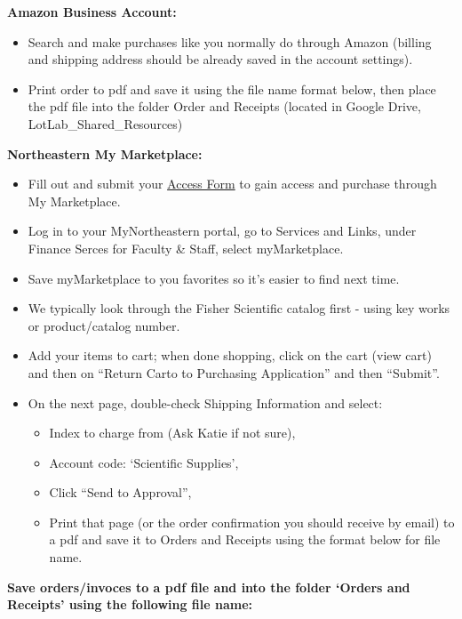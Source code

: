 \documentclass[
  letterpaper,
  DIV=11,
  numbers=noendperiod]{scrreprt}
\begin{document}
\textbf{Amazon Business Account:}

\begin{itemize}
\item
  Search and make purchases like you normally do through Amazon (billing
  and shipping address should be already saved in the account settings).
\item
  Print order to pdf and save it using the file name format below, then
  place the pdf file into the folder Order and Receipts (located in
  Google Drive, LotLab\_Shared\_Resources)
\end{itemize}

\textbf{Northeastern My Marketplace:}

\begin{itemize}
\item
  Fill out and submit your
  \href{https://github.com/thais-neu/Thais_lab_protocols/files/7541425/myMarketplace-Access-Form.pdf}{Access
  Form} to gain access and purchase through My Marketplace.
\item
  Log in to your MyNortheastern portal, go to Services and Links, under
  Finance Serces for Faculty \& Staff, select myMarketplace.
\item
  Save myMarketplace to you favorites so it's easier to find next time.
\item
  We typically look through the Fisher Scientific catalog first - using
  key works or product/catalog number.
\item
  Add your items to cart; when done shopping, click on the cart (view
  cart) and then on ``Return Carto to Purchasing Application'' and then
  ``Submit''.
\item
  On the next page, double-check Shipping Information and select:

  \begin{itemize}
  \item
    Index to charge from (Ask Katie if not sure),
  \item
    Account code: `Scientific Supplies',
  \item
    Click ``Send to Approval'',
  \item
    Print that page (or the order confirmation you should receive by
    email) to a pdf and save it to Orders and Receipts using the format
    below for file name.
  \end{itemize}
\end{itemize}

\textbf{Save orders/invoces to a pdf file and into the folder `Orders
and Receipts' using the following file name:}
\end{document}
